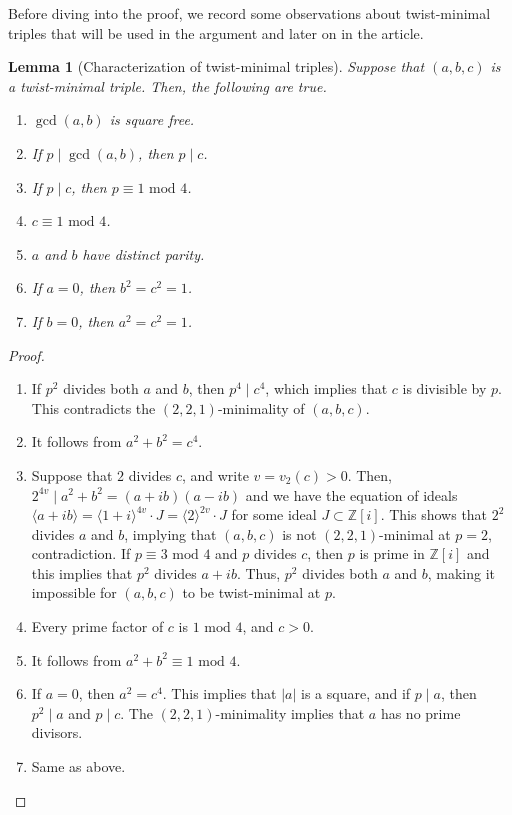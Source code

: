 \documentclass[12pt]{amsart}
\newcounter{counter}[section] %
\numberwithin{equation}{section} %
\newtheorem{lemma}[counter]{Lemma}
\theoremstyle{definition} \newtheorem{definition}[counter]{Definition}
\theoremstyle{remark} \newtheorem{nonexam}[counter]{Non-example}
\newcommand{\ZZ}{\mathbb{Z}} %
\newcommand{\md}{\text{ mod }} %
\begin{document}
Before diving into the proof, we record some observations about twist-minimal
triples that will be used in the argument and later on in the article.

\begin{lemma}[Characterization of twist-minimal triples]
  \label{lemma:twist-min-triples}
  Suppose that $(a,b,c)$ is a twist-minimal triple. Then, the
  following are true.
  \begin{enumerate}[label=(\alph*)]
  \item $\gcd(a,b)$ is square free.
  \item If $p \mid \gcd(a,b)$, then $p \mid c$.
  \item If $p \mid c$, then $p \equiv 1 \md 4$.
  \item $c \equiv 1 \md 4$.
  \item $a$ and $b$ have distinct parity.
  \item If $a = 0$, then $b^2 = c^2 = 1$.
  \item If $b = 0$, then $a^2 = c^2 = 1$.
  \end{enumerate}
\end{lemma}
\begin{proof}
  \hfill
  \begin{enumerate}[label=(\alph*)]
  \item If $p^2$ divides both $a$ and $b$, then $p^4 \mid c^4$, which
    implies that $c$ is divisible by $p$. This contradicts the
    $(2,2,1)$-minimality of $(a,b,c)$.
  \item It follows from $a^2 + b^2 = c^4$.
  \item Suppose that $2$ divides $c$, and write $v = v_2(c) > 0$. Then,
    $2^{4v} \mid a^2 + b^2 = (a+ib)(a-ib)$ and we have the equation of ideals
    $\langle a+ib\rangle = \langle 1+i\rangle^{4v}\cdot J = \langle
    2\rangle^{2v}\cdot J$ for some ideal $J \subset \ZZ[i]$. This shows that
    $2^2$ divides $a$ and $b$, implying that $(a,b,c)$ is not $(2,2,1)$-minimal
    at $p=2$, contradiction. If $p \equiv 3 \md 4$ and $p$ divides $c$, then
    $p$ is prime in $\ZZ[i]$ and this implies that $p^{2}$ divides $a + ib$.
    Thus, $p^2$ divides both $a$ and $b$, making it impossible for $(a,b,c)$ to
    be twist-minimal at $p$.
  \item Every prime factor of $c$ is $1 \md 4$, and $c > 0$.
  \item It follows from $a^2 + b^2 \equiv 1 \md 4$.
  \item If $a = 0$, then $a^2 = c^4$. This implies that $|a|$ is a
    square, and if $p \mid a$, then $p^2 \mid a$ and $p \mid c$. The
    $(2,2,1)$-minimality implies that $a$ has no prime divisors.
  \item Same as above.
  \end{enumerate}
\end{proof}
\end{document}
